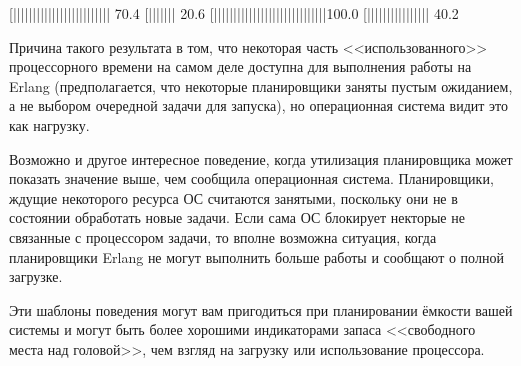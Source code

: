 \begin{VerbatimText}
[|||||||||||||||||||||||||     70.4%
[|||||||                       20.6%
[|||||||||||||||||||||||||||||100.0%
[||||||||||||||||              40.2%
\end{VerbatimText}

Причина такого результата в том, что некоторая часть <<использованного>> процессорного времени на самом деле доступна для выполнения работы на Erlang (предполагается, что некоторые планировщики заняты пустым ожиданием, а не выбором очередной задачи для запуска), но операционная система видит это как нагрузку.

Возможно и другое интересное поведение, когда утилизация планировщика может показать значение выше, чем сообщила операционная система. Планировщики, ждущие некоторого ресурса ОС считаются занятыми, поскольку они не в состоянии обработать новые задачи. Если сама ОС блокирует некторые не связанные с процессором задачи, то вполне возможна ситуация, когда планировщики Erlang не могут выполнить больше работы и сообщают о полной загрузке.

Эти шаблоны поведения могут вам пригодиться при планировании ёмкости вашей системы и могут быть более хорошими индикаторами запаса <<свободного места над головой>>, чем взгляд на загрузку или использование процессора.


